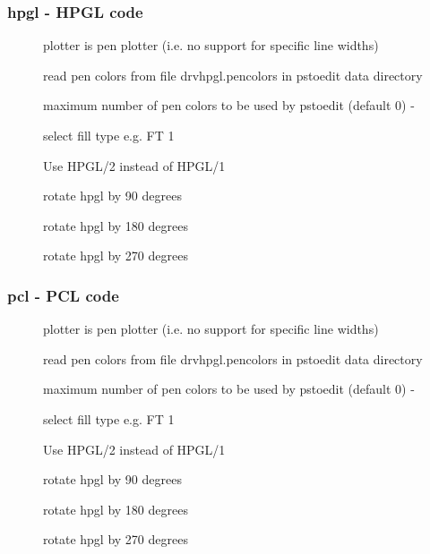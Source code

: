 \documentclass[english,a4paper]{article}
\begin{document}
\subsubsection{hpgl - HPGL code}
\begin{description}
\item[] 
plotter is pen plotter (i.e. no support for specific line widths)


\item[] 
read pen colors from file drvhpgl.pencolors in pstoedit data directory


\item[] 
maximum number of pen colors to be used by pstoedit (default 0) - 


\item[] 
select fill type e.g. FT 1


\item[] 
Use HPGL/2 instead of HPGL/1


\item[] 
rotate hpgl by 90 degrees


\item[] 
rotate hpgl by 180 degrees


\item[] 
rotate hpgl by 270 degrees


\end{description}
\subsubsection{pcl - PCL code}
\begin{description}
\item[] 
plotter is pen plotter (i.e. no support for specific line widths)


\item[] 
read pen colors from file drvhpgl.pencolors in pstoedit data directory


\item[] 
maximum number of pen colors to be used by pstoedit (default 0) - 


\item[] 
select fill type e.g. FT 1


\item[] 
Use HPGL/2 instead of HPGL/1


\item[] 
rotate hpgl by 90 degrees


\item[] 
rotate hpgl by 180 degrees


\item[] 
rotate hpgl by 270 degrees


\end{description}
\end{document}
